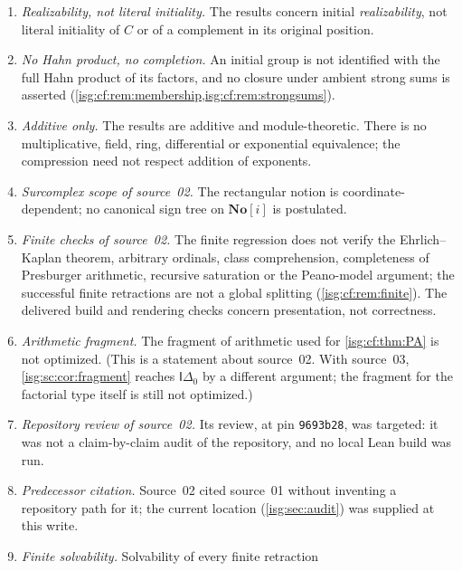 \documentclass[11pt]{article}
\theoremstyle{definition}
\theoremstyle{remark}
\newcommand{\No}{\ensuremath{\mathbf{No}}}
\newcommand{\Idelta}{\mathsf{I}\Delta_0}
\begin{document}
\begin{enumerate}[label=\textup{(N\arabic*)},leftmargin=*]
      \cref{isg:cf:thm:split} depends on the chosen realization and is not
      invariant under abstract automorphisms; only the Presburger split
      case has the uniqueness of \cref{isg:cf:prop:residuesplit}.
\item \emph{Realizability, not literal initiality.} The results concern
      initial \emph{realizability}, not literal initiality of $C$ or of a
      complement in its original position.
\item \emph{No Hahn product, no completion.} An initial group is not
      identified with the full Hahn product of its factors, and no closure
      under ambient strong sums is asserted
      (\cref{isg:cf:rem:membership,isg:cf:rem:strongsums}).
\item \emph{Additive only.} The results are additive and
      module-theoretic. There is no multiplicative, field, ring,
      differential or exponential equivalence; the compression need not
      respect addition of exponents.
\item \emph{Surcomplex scope of source~02.} The rectangular notion is
      coordinate-dependent; no canonical sign tree on $\No[i]$ is
      postulated.
\item \emph{Finite checks of source~02.} The finite regression does not
      verify the Ehrlich--Kaplan theorem, arbitrary ordinals, class
      comprehension, completeness of Presburger arithmetic, recursive
      saturation or the Peano-model argument; the successful finite
      retractions are not a global splitting (\cref{isg:cf:rem:finite}).
      The delivered build and rendering checks concern presentation, not
      correctness.
\item \emph{Arithmetic fragment.} The fragment of arithmetic used for
      \cref{isg:cf:thm:PA} is not optimized. (This is a statement about
      source~02. With source~03, \cref{isg:sc:cor:fragment} reaches
      $\Idelta$ by a different argument; the fragment for the factorial
      type itself is still not optimized.)
\item \emph{Repository review of source~02.} Its review, at pin
      \texttt{9693b28}, was targeted: it was not a claim-by-claim audit
      of the repository, and no local Lean build was run.
\item \emph{Predecessor citation.} Source~02 cited source~01 without
      inventing a repository path for it; the current location
      (\cref{isg:sec:audit}) was supplied at this write.
\item \emph{Finite solvability.} Solvability of every finite retraction

\end{enumerate}
\end{document}
